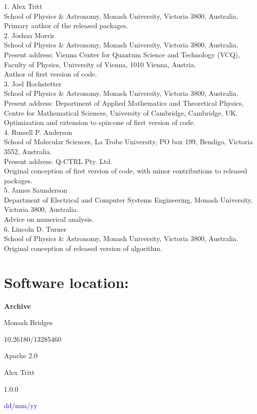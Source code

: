 \documentclass{jors}
\begin{document}
1. Alex Tritt\\
	School of Physics \& Astronomy, Monash University, Victoria 3800, Australia.\\
	Primary author of the released packages.\\
2. Joshua Morris\\
	School of Physics \& Astronomy, Monash University, Victoria 3800, Australia.\\
	Present address: Vienna Center for Quantum Science and Technology (VCQ), Faculty of Physics, University of Vienna, 1010 Vienna, Austria.\\
	Author of first version of code.\\
3. Joel Hochstetter\\
	School of Physics \& Astronomy, Monash University, Victoria 3800, Australia.\\
	Present address: Department of Applied Mathematics and Theoretical Physics, Centre for Mathematical Sciences, University of Cambridge, Cambridge, UK.\\
	Optimization and extension to spin-one of first version of code.\\
4. Russell P. Anderson\\
	School of Molecular Sciences, La Trobe University, PO box 199, Bendigo, Victoria 3552, Australia.\\
	Present address: Q-CTRL Pty. Ltd.\\
	Original conception of first version of code, with minor contributions to released packages.\\
5. James Saunderson\\
	Department of Electrical and Computer Systems Engineering, Monash University, Victoria 3800, Australia.\\
	Advice on numerical analysis.\\
6. Lincoln D. Turner\\
	School of Physics \& Astronomy, Monash University, Victoria 3800, Australia.\\
	Original conception of released version of algorithm.

\section{Software location:}

{\bf Archive}

\begin{description}[noitemsep,topsep=0pt]
	\item[Name:] Monash Bridges
	\item[Persistent identifier:] 10.26180/13285460
	\item[Licence:] Apache 2.0
	\item[Publisher:]  Alex Tritt
	\item[Version published:] 1.0.0
	\item[Date published:] \textcolor{blue}{dd/mm/yy}
\end{description}
\end{document}
